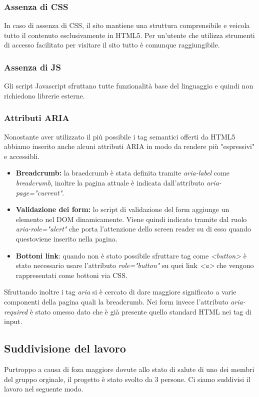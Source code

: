 \subsubsection{Assenza di CSS}
In caso di assenza di CSS, il sito mantiene una struttura comprensibile e veicola tutto il contenuto esclusivamente in HTML5. Per un'utente che utilizza strumenti di accesso facilitato per visitare il sito tutto è comunque raggiungibile.

\subsubsection{Assenza di JS}
Gli script Javascript sfruttano tutte funzionalità base del linguaggio e quindi non richiedono librerie esterne.

\subsubsection{Attributi ARIA}
Nonostante aver utilizzato il più possibile i tag semantici offerti da HTML5 abbiamo inserito anche alcuni attributi ARIA in modo da rendere più "espressivi" e accessibli.
\begin{itemize}
    \item \textbf{Breadcrumb:} la braedcrumb è stata definita tramite \textit{aria-label} come \textit{breadcrumb}, inoltre la pagina attuale è indicata dall'attributo \textit{aria-page="current"}.
    \item \textbf{Validazione dei form:} lo script di validazione del form aggiunge un elemento nel DOM dinamicamente. Viene quindi indicato tramite dal ruolo \textit{aria-role="alert"} che porta l'attenzione dello screen reader su di esso quando questoviene inserito nella pagina.
    \item \textbf{Bottoni link}: quando non è stato possibile sfruttare tag come \textit{<button>} è stato necessario usare l'attributo \textit{role="button"} su quei link \textit{<a>} che vengono rappresentati come bottoni via CSS.
\end{itemize}

Sfruttando inoltre i tag \textit{aria} si è cercato di dare maggiore significato a varie componenti della pagina quali la breadcrumb. Nei form invece l'attributo \textit{aria-required} è stato omesso dato che è già presente quello standard HTML nei tag di input.

\subsection{Suddivisione del lavoro}
Purtroppo a causa di foza maggiore dovute allo stato di salute di uno dei membri del gruppo orginale, il progetto è stato svolto da 3 persone. Ci siamo suddivisi il lavoro nel seguente modo.

